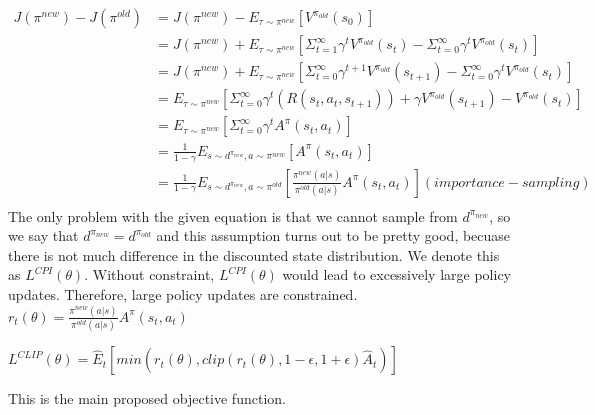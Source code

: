 \documentclass[12pt]{extarticle}
\begin{document}
\begin{equation}
\begin{aligned}
J(\pi^{new})- J(\pi^{old}) &= J(\pi^{new})-E_{\tau \sim \pi^{new}}[V^{\pi_{old}}(s_0)] \\
& = J(\pi^{new})+ E_{\tau \sim \pi^{new}}[\Sigma_{t=1}^{\infty} \gamma^t V^{\pi_{old}}(s_t)-\Sigma_{t=0}^{\infty} \gamma^t V^{\pi_{old}}(s_t)]\\
& = J(\pi^{new})+ E_{\tau \sim \pi^{new}}[\Sigma_{t=0}^{\infty} \gamma^{t+1} V^{\pi_{old}}(s_{t+1})-\Sigma_{t=0}^{\infty} \gamma^t V^{\pi_{old}}(s_t)]\\
& =E_{\tau \sim \pi^{new}}[\Sigma_{t=0}^{\infty}\gamma^t(R(s_t,a_t,s_{t+1})) +\gamma V^{\pi_{old}}(s_{t+1})-V^{\pi_{old}}(s_t)]\\
& = E_{\tau \sim \pi^{new}}[\Sigma_{t=0}^{\infty} \gamma^t A^{\pi}(s_t,a_t)]\\
& = \frac{1}{1-\gamma} E_{s \sim d^{\pi_{new}}, a \sim \pi^{new}} [A^{\pi}(s_t,a_t)]\\
& = \frac{1}{1-\gamma} E_{s \sim d^{\pi_{new}}, a \sim \pi^{old}} [ \frac{\pi^{new}(a|s)}{\pi^{old}(a|s)}A^{\pi}(s_t,a_t)] (importance-sampling)\\
\end{aligned}
\end{equation}
The only problem with the given equation is that we cannot sample from $d^{\pi_{new}}$, so we say that $d^{\pi_{new}}=d^{\pi_{old}}$ and this assumption turns out to be pretty good, becuase there is not much difference in the discounted state distribution. 
\newline
We denote this as $L^{CPI}(\theta)$.
Without constraint, $L^{CPI}(\theta)$ would lead to excessively large policy updates. Therefore, large policy updates are constrained.\\
 $r_t(\theta)=\frac{\pi^{new}(a|s)}{\pi^{old}(a|s)}A^{\pi}(s_t,a_t)$\\
\begin{center}$L^{CLIP}(\theta)=\hat{E}_t[min(r_t(\theta), clip(r_t(\theta), 1-\epsilon, 1+\epsilon)\hat{A}_t)]$\\
\end{center}

This is the main proposed objective function. 
\end{document}
